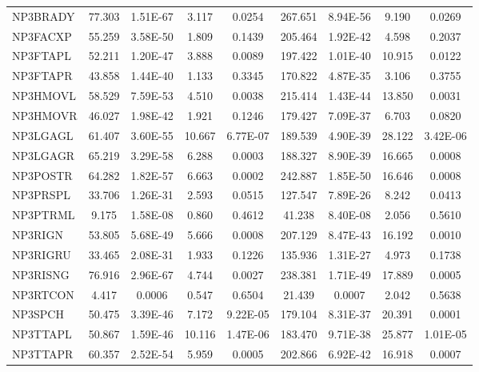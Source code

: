 \documentclass[twocolumn]{article}
\begin{document}
\begin{table}[ht!]
{\begin{tabular}{lcccccccc}
        NP3BRADY & 77.303 & 1.51E-67 & 3.117 & 0.0254 & 267.651 & 8.94E-56 & 9.190 & 0.0269 \\ 
        NP3FACXP & 55.259 & 3.58E-50 & 1.809 & 0.1439 & 205.464 & 1.92E-42 & 4.598 & 0.2037 \\ 
        NP3FTAPL & 52.211 & 1.20E-47 & 3.888 & 0.0089 & 197.422 & 1.01E-40 & 10.915 & 0.0122 \\ 
        NP3FTAPR & 43.858 & 1.44E-40 & 1.133 & 0.3345 & 170.822 & 4.87E-35 & 3.106 & 0.3755 \\ 
        NP3HMOVL & 58.529 & 7.59E-53 & 4.510 & 0.0038 & 215.414 & 1.43E-44 & 13.850 & 0.0031 \\ 
        NP3HMOVR & 46.027 & 1.98E-42 & 1.921 & 0.1246 & 179.427 & 7.09E-37 & 6.703 & 0.0820 \\ 
        NP3LGAGL & 61.407 & 3.60E-55 & 10.667 & 6.77E-07 & 189.539 & 4.90E-39 & 28.122 & 3.42E-06 \\ 
        NP3LGAGR & 65.219 & 3.29E-58 & 6.288 & 0.0003 & 188.327 & 8.90E-39 & 16.665 & 0.0008 \\ 
        NP3POSTR & 64.282 & 1.82E-57 & 6.663 & 0.0002 & 242.887 & 1.85E-50 & 16.646 & 0.0008 \\ 
        NP3PRSPL & 33.706 & 1.26E-31 & 2.593 & 0.0515 & 127.547 & 7.89E-26 & 8.242 & 0.0413 \\ 
        NP3PTRML & 9.175 & 1.58E-08 & 0.860 & 0.4612 & 41.238 & 8.40E-08 & 2.056 & 0.5610 \\ 
        NP3RIGN & 53.805 & 5.68E-49 & 5.666 & 0.0008 & 207.129 & 8.47E-43 & 16.192 & 0.0010 \\ 
        NP3RIGRU & 33.465 & 2.08E-31 & 1.933 & 0.1226 & 135.936 & 1.31E-27 & 4.973 & 0.1738 \\ 
        NP3RISNG & 76.916 & 2.96E-67 & 4.744 & 0.0027 & 238.381 & 1.71E-49 & 17.889 & 0.0005 \\ 
        NP3RTCON & 4.417 & 0.0006 & 0.547 & 0.6504 & 21.439 & 0.0007 & 2.042 & 0.5638 \\ 
        NP3SPCH & 50.475 & 3.39E-46 & 7.172 & 9.22E-05 & 179.104 & 8.31E-37 & 20.391 & 0.0001 \\ 
        NP3TTAPL & 50.867 & 1.59E-46 & 10.116 & 1.47E-06 & 183.470 & 9.71E-38 & 25.877 & 1.01E-05 \\ 
        NP3TTAPR & 60.357 & 2.52E-54 & 5.959 & 0.0005 & 202.866 & 6.92E-42 & 16.918 & 0.0007 \\ \hline
    \end{tabular}%
    }
\end{table}
\end{document}
